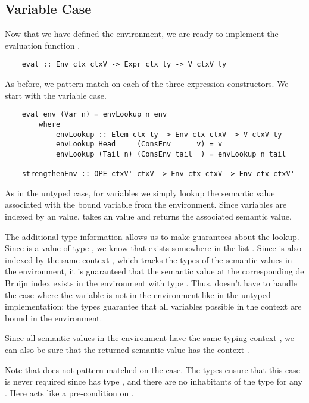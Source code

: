 
\subsection{Variable Case}
\label{subsect:typedVarCase}

Now that we have defined the environment, we are ready to implement the evaluation function .

\begin{lstlisting}
    eval :: Env ctx ctxV -> Expr ctx ty -> V ctxV ty
\end{lstlisting}

As before, we pattern match on each of the three expression constructors. We start with the variable case.

\begin{lstlisting}
    eval env (Var n) = envLookup n env
        where
            envLookup :: Elem ctx ty -> Env ctx ctxV -> V ctxV ty 
            envLookup Head     (ConsEnv _    v) = v
            envLookup (Tail n) (ConsEnv tail _) = envLookup n tail

    strengthenEnv :: OPE ctxV' ctxV -> Env ctx ctxV -> Env ctx ctxV'
\end{lstlisting}

As in the untyped case, for variables we simply lookup the semantic value associated with the bound variable from the environment. Since variables are indexed by an  value,  takes an  value and returns the associated semantic value.

The additional type information allows us to make guarantees about the lookup. Since  is a value of type , we know that  exists somewhere in the list . Since  is also indexed by the same context , which tracks the types of the semantic values in the environment, it is guaranteed that the semantic value at the corresponding de Bruijn index exists in the environment with type . Thus,  doesn't have to handle the case where the variable is not in the environment like in the untyped implementation; the types guarantee that all variables possible in the context  are bound in the environment.

Since all semantic values in the environment have the same typing context , we can also be sure that the returned semantic value has the context .

Note that  does not pattern matched on the  case. The types ensure that this case is never required since  has type , and there are no inhabitants of the type  for any . Here  acts like a pre-condition on .

